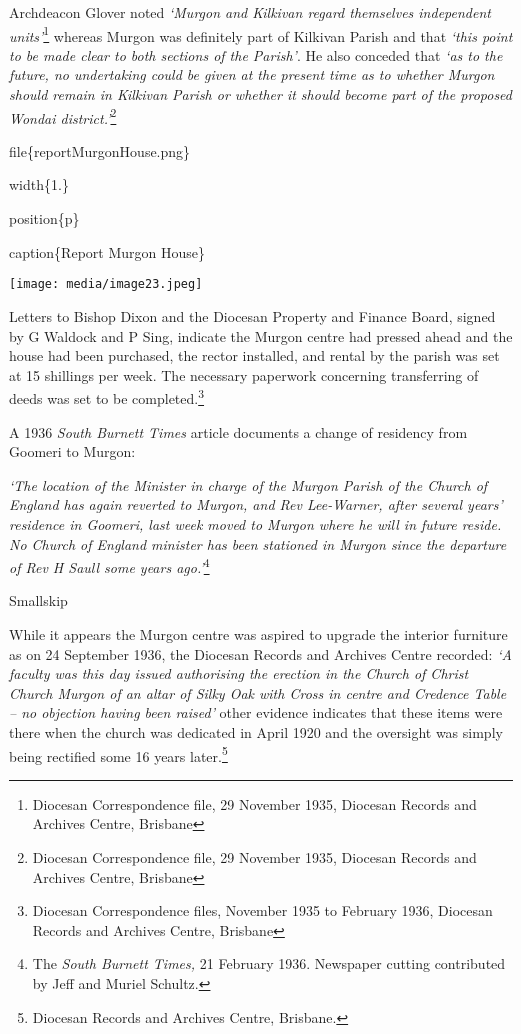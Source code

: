 Archdeacon Glover noted \emph{`Murgon and Kilkivan regard themselves independent units'}\footnote{Diocesan Correspondence file, 29 November 1935, Diocesan Records and Archives Centre, Brisbane} whereas Murgon was definitely part of Kilkivan Parish and that \emph{`this point to be made clear to both sections of the Parish'}. He also conceded that \emph{`as to the future, no undertaking could be given at the present time as to whether Murgon should remain in Kilkivan Parish or whether it should become part of the proposed Wondai district.'}\footnote{Diocesan Correspondence file, 29 November 1935, Diocesan Records and Archives Centre, Brisbane}

file\{reportMurgonHouse.png\}

width\{1.\}

position\{p\}

caption\{Report Murgon House\}

\texttt{[image: media/image23.jpeg]}

Letters to Bishop Dixon and the Diocesan Property and Finance Board, signed by G Waldock and P Sing, indicate the Murgon centre had pressed ahead and the house had been purchased, the rector installed, and rental by the parish was set at 15 shillings per week. The necessary paperwork concerning transferring of deeds was set to be completed.\footnote{Diocesan Correspondence files, November 1935 to February 1936, Diocesan Records and Archives Centre, Brisbane}

A 1936 \emph{South Burnett Times} article documents a change of residency from Goomeri to Murgon:

\emph{`The location of the Minister in charge of the Murgon Parish of the Church of England has again reverted to Murgon, and Rev Lee-Warner, after several years' residence in Goomeri, last week moved to Murgon where he will in future reside. No Church of England minister has been stationed in Murgon since the departure of Rev H Saull some years ago.'}\footnote{The \emph{South Burnett Times,} 21 February 1936. Newspaper cutting contributed by Jeff and Muriel Schultz.}

Smallskip

While it appears the Murgon centre was aspired to upgrade the interior furniture as on 24 September 1936, the Diocesan Records and Archives Centre recorded: \emph{`A faculty was this day issued authorising the erection in the Church of Christ Church Murgon of an altar of Silky Oak with Cross in centre and Credence Table -- no objection having been raised'} other evidence indicates that these items were there when the church was dedicated in April 1920 and the oversight was simply being rectified some 16 years later.\footnote{Diocesan Records and Archives Centre, Brisbane.}

